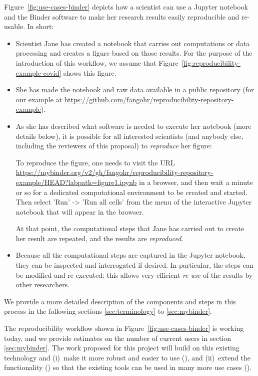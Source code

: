 Figure~\ref{fig:use-cases-binder} depicts how a scientist can use a Jupyter
notebook and the Binder software to make her research results easily
reproducible and re-usable. In short:
\begin{itemize}
\item Scientist Jane has created a notebook that carries out computations or
  data processing and creates a figure based on those results. For the purpose
  of the introduction of this workflow, we assume that
  Figure~\ref{fig:reproducibility-example-covid} shows this figure.

\item She has made the notebook and raw data available in a public repository
  (for our example at\newline
  \mbox{\url{https://github.com/fangohr/reproducibility-repository-example}}).

\item As she has described what software is needed to execute her notebook (more
  details below), it is possible for all interested scientists (and anybody
  else, including the reviewers of this proposal) to \emph{reproduce} her
  figure:

  To reproduce the figure, one needs to visit the URL\newline
  \mbox{\url{https://mybinder.org/v2/gh/fangohr/reproducibility-repository-example/HEAD?labpath=figure1.ipynb}}
  in a browser, and then wait a minute or so for a dedicated computational
  environment to be created and started. Then select 'Run' -> 'Run all cells'
  from the menu of the interactive Jupyter notebook that will appear in the
  browser.

  At that point, the computational steps that Jane has carried out to create her
  result are repeated, and the results are \emph{reproduced}.
  
\item Because all the computational steps are captured in the Jupyter notebook,
  they can be inspected and interrogated if desired. In particular, the steps
  can be modified and re-executed: this allows very efficient \emph{re-use} of
  the results by other researchers.
\end{itemize}

We provide a more detailed description of the components and steps in this
process in the following sections \ref{sec:terminology} to \ref{sec:mybinder}.

The reproducibility workflow shown in Figure~\ref{fig:use-cases-binder} is
working today, and we provide estimates on the number of current users in
section \ref{sec:mybinder}. The work proposed for this project will build on
this existing technology and (i)~make it more robust and easier to use
(), and (ii)~extend the functionality () so
that the existing tools can be used in many more use cases
().

